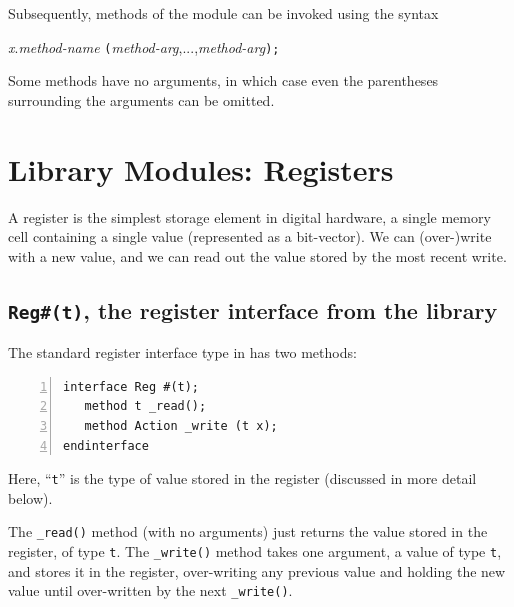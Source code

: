 Subsequently, methods of the module can be invoked using the syntax


\hmmmm \emph{x}.\emph{method-name} {\tt (}\emph{method-arg},...,\emph{method-arg}{\tt );}

Some methods have no arguments, in which case even the parentheses
surrounding the arguments can be omitted.


\section{{\BSV} Library Modules: Registers}


A register is the simplest storage element in digital hardware, a
single memory cell containing a single value (represented as a
bit-vector).  We can (over-)write with a new value, and we can read
out the value stored by the most recent write.


\subsection{{\tt Reg\#(t)}, the register interface from the {\BSV} library}

\label{Sec_Register_interface}


The standard register interface type in {\BSV} has two methods:

{\footnotesize
\begin{Verbatim}[frame=single, numbers=left]
interface Reg #(t);
   method t _read();
   method Action _write (t x);
endinterface
\end{Verbatim}
}

Here, ``\verb|t|'' is the type of value stored in the register
(discussed in more detail below).

The \verb|_read()| method (with no arguments) just returns the value
stored in the register, of type \verb|t|.  The \verb|_write()| method
takes one argument, a value of type \verb|t|, and stores it in the
register, over-writing any previous value and holding the new value
until over-written by the next \verb|_write()|.

